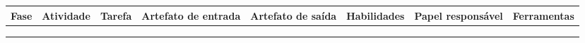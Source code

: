 \label{tab_visao_estatica} 
\begin{table}[]
\begin{tabular}{|l|l|l|l|l|l|l|l|}
\hline
\textbf{Fase} & \textbf{Atividade} & \textbf{Tarefa} & \textbf{Artefato de entrada} & \textbf{Artefato de saída} & \textbf{Habilidades} & \textbf{Papel responsável} & \textbf{Ferramentas} \\ \hline
 &  &  &  &  &  &  &  \\ \hline
 &  &  &  &  &  &  &  \\ \hline
 &  &  &  &  &  &  &  \\ \hline
\end{tabular}
\end{table}